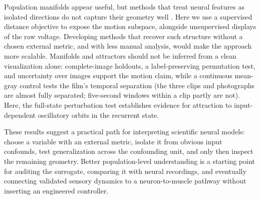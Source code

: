\documentclass[11pt]{article}
\begin{document}
Population manifolds appear useful, but methods that treat neural features as isolated directions do not capture their geometry well \cite{modell2025,goodfire}. Here we use a supervised distance objective to expose the motion subspace, alongside unsupervised displays of the raw voltage. Developing methods that recover such structure without a chosen external metric, and with less manual analysis, would make the approach more scalable. Manifolds and attractors should not be inferred from a clean visualization alone: complete-image holdouts, a label-preserving permutation test, and uncertainty over images support the motion claim, while a continuous mean-gray control tests the film's temporal separation (the three clips and photographs are almost fully separated; five-second windows within a clip partly are not). Here, the full-state perturbation test establishes evidence for attraction to input-dependent oscillatory orbits in the recurrent state.

These results suggest a practical path for interpreting scientific neural models: choose a variable with an external metric, isolate it from obvious input confounds, test generalization across the confounding unit, and only then inspect the remaining geometry. Better population-level understanding is a starting point for auditing the surrogate, comparing it with neural recordings, and eventually connecting validated sensory dynamics to a neuron-to-muscle pathway without inserting an engineered controller.
\end{document}
